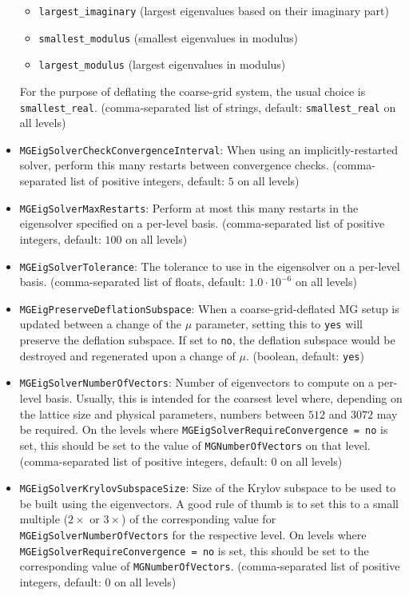 \begin{itemize}
{\begin{itemize}
      \item \texttt{largest\_imaginary} (largest eigenvalues based on their imaginary part)
      \item \texttt{smallest\_modulus} (smallest eigenvalues in modulus)
      \item \texttt{largest\_modulus} (largest eigenvalues in modulus)
    \end{itemize}
    For the purpose of deflating the coarse-grid system, the usual choice is \texttt{smallest\_real}.
    (comma-separated list of strings, default: \texttt{smallest\_real} on all levels)}
  \item{ \texttt{MGEigSolverCheckConvergenceInterval}: When using an implicitly-restarted solver, perform this many restarts between convergence checks. (comma-separated list of positive integers, default: $5$ on all levels)}
  \item{ \texttt{MGEigSolverMaxRestarts}: Perform at most this many restarts in the eigensolver specified on a per-level basis. (comma-separated list of positive integers, default: $100$ on all levels)}
  \item{ \texttt{MGEigSolverTolerance}: The tolerance to use in the eigensolver on a per-level basis. (comma-separated list of floats, default: $1.0\cdot10^{-6}$ on all levels)}
  \item{ \texttt{MGEigPreserveDeflationSubspace}: When a coarse-grid-deflated MG setup is updated between a change of the $\mu$ parameter, setting this to \texttt{yes} will preserve the deflation subspace. If set to \texttt{no}, the deflation subspace would be destroyed and regenerated upon a change of $\mu$. (boolean, default: \texttt{yes})}
  \item{ \texttt{MGEigSolverNumberOfVectors}: Number of eigenvectors to compute on a per-level basis. Usually, this is intended for the coarsest level where, depending on the lattice size and physical parameters, numbers between $512$ and $3072$ may be required. On the levels where \texttt{MGEigSolverRequireConvergence = no} is set, this should be set to the value of \texttt{MGNumberOfVectors} on that level. (comma-separated list of positive integers, default: $0$ on all levels)}
  \item{ \texttt{MGEigSolverKrylovSubspaceSize}: Size of the Krylov subspace to be used to be built using the eigenvectors. A good rule of thumb is to set this to a small multiple ($2\times$ or $3\times$) of the corresponding value for \texttt{MGEigSolverNumberOfVectors} for the respective level. On levels where \texttt{MGEigSolverRequireConvergence = no} is set, this should be set to the corresponding value of \texttt{MGNumberOfVectors}. (comma-separated list of positive integers, default: $0$ on all levels)}

\end{itemize}
